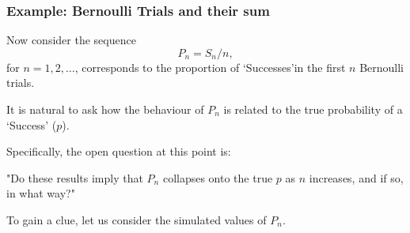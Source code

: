 \documentclass[notes=show,smaller,handout]{beamer}
\newenvironment{stepitemize}{\begin{itemize}[<+->]}{\end{itemize} }
\begin{document}
\begin{frame}%

\frametitle{Example: Bernoulli Trials and their sum}


Now consider the sequence 
$${P}_n=S_n/n,$$ 
for $n=1,2,\ldots$, corresponds to the proportion of `Successes'in the first $n$ Bernoulli trials.
\vspace{0.4cm}


It is natural to ask how the behaviour of  ${P}_n$ is related to the true probability of a `Success' ($p$).
\vspace{0.4cm}


Specifically, the open question at this point is: \\
\vspace{0.3cm}
\begin{center}
\color{red} "Do these results imply that ${P}_n$ collapses onto the true $p$ as $n$ increases, and if 
so, in what way?"  \color{black} \\ \vspace{0.3cm}
\end{center}
To gain a clue, let us consider the simulated values of ${P}_n$.

\end{frame}%
\end{document}
